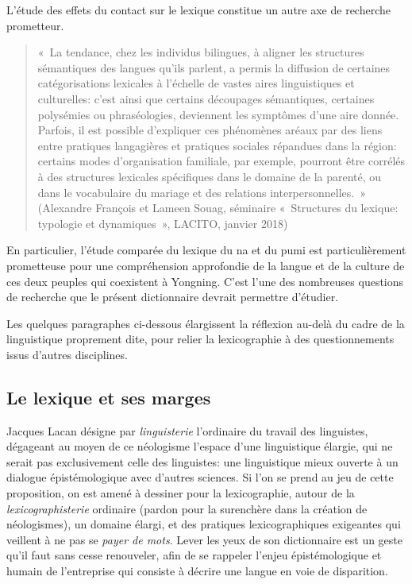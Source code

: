 L'étude des effets du contact sur le lexique constitue un autre axe de recherche prometteur.

\begin{quote}
« La tendance, chez les individus bilingues, à aligner les structures sémantiques des langues qu’ils parlent, a permis la diffusion de certaines catégorisations lexicales à l’échelle de vastes aires linguistiques et culturelles: c’est ainsi que certains découpages sémantiques, certaines polysémies ou phraséologies, deviennent les symptômes d’une aire donnée. Parfois, il est possible d’expliquer ces phénomènes aréaux par des liens entre pratiques langagières et pratiques sociales répandues dans la région: certains modes d’organisation familiale, par exemple, pourront être corrélés à des structures lexicales spécifiques dans le domaine de la parenté, ou dans le vocabulaire du mariage et des relations interpersonnelles. » (Alexandre François et Lameen Souag, séminaire « Structures du lexique: typologie et dynamiques », LACITO, janvier 2018)
\end{quote}

En particulier, l'étude comparée du lexique du na et du pumi \parencite{daudey2014} est particulièrement prometteuse pour une compréhension approfondie de la langue et de la culture de ces deux peuples qui coexistent à Yongning. C'est l'une des nombreuses questions de recherche que le présent dictionnaire devrait permettre d'étudier.

Les quelques paragraphes ci-dessous élargissent la réflexion au-delà du cadre de la linguistique proprement dite, pour relier la lexicographie à des questionnements issus d'autres disciplines.

\subsection{Le lexique et ses marges}
\label{sec:marges}
Jacques Lacan désigne par \emph{linguisterie} l'ordinaire du travail des linguistes, dégageant au moyen de ce néologisme l'espace d'une linguistique élargie, qui ne serait pas exclusivement celle des linguistes: une linguistique mieux ouverte à un dialogue épistémologique avec d'autres sciences. Si l'on se prend au jeu de cette proposition, on est amené à dessiner pour la lexicographie, autour de la \emph{lexicographisterie} ordinaire (pardon pour la surenchère dans la création de néologismes), un domaine élargi, et des pratiques lexicographiques exigeantes qui veillent à ne pas se \emph{payer de mots}. Lever les yeux de son dictionnaire est un geste qu'il faut sans cesse renouveler, afin de se rappeler l’enjeu épistémologique et humain de l’entreprise qui consiste à décrire une langue en voie de disparition.

